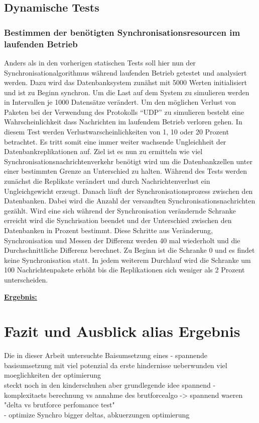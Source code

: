 \documentclass[a4paper,11pt,oneside,%
headsepline,												%
footsepline,												%
bibtotocnumbered									%
]{scrreprt}
\begin{document}
\section{Dynamische Tests}
\subsection{Bestimmen der benötigten Synchronisationsresourcen im laufenden Betrieb}
Anders als in den vorherigen statischen Tests soll hier nun der Synchronisationalgorithmus während laufenden Betrieb getestet und analysiert werden. Dazu wird das Datenbanksystem zunähst mit 5000 Werten initialisiert und ist zu Beginn synchron. Um die Last auf dem System zu simulieren werden in Intervallen je 1000 Datensätze verändert. Um den möglichen Verlust von Paketen bei der Verwendung des Protokolls \enquote{UDP} zu simulieren besteht eine Wahrscheinlichkeit dass Nachrichten im laufendem Betrieb verloren gehen. In diesem Test werden Verlustwarscheinlichkeiten von 1, 10 oder 20 Prozent betrachtet. Es tritt somit eine immer weiter wachsende Ungleichheit der Datenbankreplikationen auf. Ziel ist es nun zu ermitteln wie viel Synchronisationsnachrichtenverkehr benötigt wird um die Datenbankzellen unter einer bestimmten Grenze an Unterschied zu halten. Während des Tests werden zunächst die Replikate verändert und durch Nachrichtenverlust ein Ungleichgewicht erzeugt. Danach läuft der Synchronisationsprozess zwischen den Datenbanken. Dabei wird die Anzahl der versandten Synchronisationsnachrichten gezählt. Wird eine sich während der Synchronisation verändernde Schranke erreicht wird die Synchrisation beendet und der Unterschied zwischen den Datenbanken in Prozent bestimmt. Diese Schritte aus Veränderung, Synchronisation und Messen der Differenz werden 40 mal wiederholt und die Durchschnittliche Differenz berechnet. Zu Beginn ist die Schranke 0 und es findet keine Synchronisation statt. In jedem weiterem Durchlauf wird die Schranke um 100 Nachrichtenpakete erhöht bis die Replikationen sich weniger als 2 Prozent unterscheiden.

\underline{{\bf Ergebnis:}}
\chapter{Fazit und Ausblick alias Ergebnis}
Die in dieser Arbeit untersuchte Baisumsetzung eines 
- spannende basisumsetzung mit viel potenzial da erste hindernisse ueberwunden viel moeglichkeiten der optimierung\\ steckt noch in den kinderschuhen aber grundlegende idee spannend
- komplexitaets berechnung vs annahme des brutforcealgo -> spannend waeren "delta vs brutforce perfomance test"\\
- optimize Synchro bigger deltas, abkuerzungen optimierung\\
\end{document}
